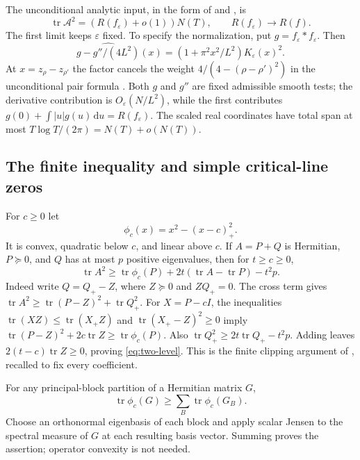 \documentclass[11pt,reqno]{amsart}
\numberwithin{equation}{section}
\newcommand{\tr}{\operatorname{tr}}
\newcommand{\dd}{\,\mathrm d}
\begin{document}
The unconditional analytic input, in the form of
\cite[Lemma 3.1 and Section 3]{Lamzouri} and
\cite[Proposition 3.1]{Knausgard2026}, is
\begin{equation}
 \tr\mathcal A^2=(R(f_\varepsilon)+o(1))N(T),\qquad
 R(f_\varepsilon)\longrightarrow R(f).
 \label{eq:trace-limit}
\end{equation}
The first limit keeps $\varepsilon$ fixed. To specify the normalization,
put $g=f_\varepsilon*f_\varepsilon$. Then
\[
 \widehat{g-g''/(4L^2)}(x)
 =(1+\pi^2x^2/L^2)K_\varepsilon(x)^2.
\]
At $x=z_\rho-z_{\rho'}$ the factor cancels the weight
$4/(4-(\rho-\rho')^2)$ in the unconditional pair formula
\cite{BGSTB}. Both $g$ and $g''$ are fixed admissible smooth tests;
the derivative contribution is $O_\varepsilon(N/L^2)$, while the first
contributes $g(0)+\int|u|g(u)\dd u=R(f_\varepsilon)$.
The scaled real coordinates have total span at most
$T\log T/(2\pi)=N(T)+o(N(T))$.

\subsection{The finite inequality and simple critical-line zeros}

For $c\ge0$ let
\begin{equation}
 \phi_c(x)=x^2-(x-c)_+^2.
 \label{eq:clipping}
\end{equation}
It is convex, quadratic below $c$, and linear above $c$. If $A=P+Q$
is Hermitian, $P\succeq0$, and $Q$ has at most $p$ positive eigenvalues,
then for $t\ge c\ge0$,
\begin{equation}
 \tr A^2\ge\tr\phi_c(P)+2t(\tr A-\tr P)-t^2p.
 \label{eq:two-level}
\end{equation}
Indeed write $Q=Q_+-Z$, where $Z\succeq0$ and $ZQ_+=0$.
The cross term gives
$\tr A^2\ge\tr(P-Z)^2+\tr Q_+^2$.
For $X=P-cI$, the inequalities
$\tr(XZ)\le\tr(X_+Z)$ and $\tr(X_+-Z)^2\ge0$ imply
$\tr(P-Z)^2+2c\tr Z\ge\tr\phi_c(P)$.
Also $\tr Q_+^2\ge2t\tr Q_+-t^2p$.
Adding leaves $2(t-c)\tr Z\ge0$, proving
\eqref{eq:two-level}. This is the finite clipping argument of
\cite{KnausgardDistinct,Knausgard2026}, recalled to fix every coefficient.

For any principal-block partition of a Hermitian matrix $G$,
\begin{equation}
 \tr\phi_c(G)\ge\sum_B\tr\phi_c(G_B).
 \label{eq:pinching}
\end{equation}
Choose an orthonormal eigenbasis of each block and apply scalar Jensen
to the spectral measure of $G$ at each resulting basis vector. Summing
proves the assertion; operator convexity is not needed.
\end{document}
